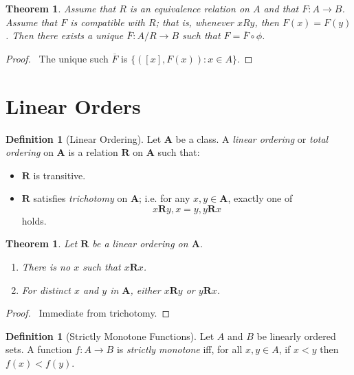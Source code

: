 \documentclass{article}
\let\qed\relax
\newtheorem{theorem}[axiom]{Theorem}
\theoremstyle{definition}
\newtheorem{definition}[axiom]{Definition}
\begin{document}
    \begin{theorem}
        Assume that $R$ is an equivalence relation on $A$ and that $F : A \rightarrow B$.
        Assume that $F$ is \emph{compatible} with $R$; that is, whenever $xRy$, then $F(x) = F(y)$.
        Then there exists a unique $\overline{F} : A / R \rightarrow B$ such that $F = \overline{F} \circ \phi$.
    \end{theorem}

    \begin{proof}
        \pf\ The unique such $\overline{F}$ is $\{ ([x],F(x)) : x \in A \}$. \qed
    \end{proof}

    \section{Linear Orders}

    \begin{definition}[Linear Ordering]
        Let $\mathbf{A}$ be a class. A \emph{linear ordering} or \emph{total ordering} on $\mathbf{A}$
        is a relation $\mathbf{R}$ on $\mathbf{A}$ such that:
        \begin{itemize}
            \item $\mathbf{R}$ is transitive.
            \item $\mathbf{R}$ satisfies \emph{trichotomy} on $\mathbf{A}$; i.e. for any $x, y \in \mathbf{A}$,
            exactly one of
            \[ x\mathbf{R}y, x=y, y\mathbf{R}x \]
            holds.
        \end{itemize}
    \end{definition}

    \begin{theorem}
        Let $\mathbf{R}$ be a linear ordering on $\mathbf{A}$.
        \begin{enumerate}
            \item There is no $x$ such that $x \mathbf{R} x$.
            \item For distinct $x$ and $y$ in $\mathbf{A}$, either $x\mathbf{R}y$ or $y\mathbf{R}x$.
        \end{enumerate}
    \end{theorem}

    \begin{proof}
        \pf\ Immediate from trichotomy. \qed
    \end{proof}

    \begin{definition}[Strictly Monotone Functions]
        Let $A$ and $B$ be linearly ordered sets. A function $f : A \rightarrow B$ is \emph{strictly
        monotone} iff, for all $x, y \in A$, if $x < y$ then $f(x) < f(y)$.
    \end{definition}
\end{document}
